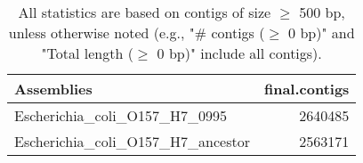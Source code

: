 \documentclass[12pt,a4paper]{article}
\begin{document}
\begin{table}[ht]
\begin{center}
\caption{All statistics are based on contigs of size $\geq$ 500 bp, unless otherwise noted (e.g., "\# contigs ($\geq$ 0 bp)" and "Total length ($\geq$ 0 bp)" include all contigs).}
\begin{tabular}{|l*{1}{|r}|}
\hline
Assemblies & final.contigs \\ \hline
Escherichia\_coli\_O157\_H7\_0995 & 2640485 \\ \hline
Escherichia\_coli\_O157\_H7\_ancestor & 2563171 \\ \hline
\end{tabular}
\end{center}
\end{table}
\end{document}
